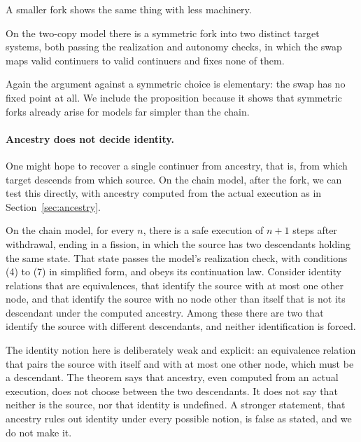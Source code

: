 A smaller fork shows the same thing with less machinery.

\begin{proposition}
\label{prop:symmetric-fork}
On the two-copy model there is a symmetric fork into two distinct target
systems, both passing the realization and autonomy checks, in which the swap
maps valid continuers to valid continuers and fixes none of them.
\end{proposition}

Again the argument against a symmetric choice is elementary: the swap has no
fixed point at all. We include the proposition because it shows that symmetric
forks already arise for models far simpler than the chain.

\paragraph{Ancestry does not decide identity.}
One might hope to recover a single continuer from ancestry, that is, from
which target descends from which source. On the chain model, after the fork,
we can test this directly, with ancestry computed from the actual execution as
in Section~\ref{sec:ancestry}.

\begin{theorem}
\label{thm:identity}
On the chain model, for every $n$, there is a safe execution of $n+1$ steps
after withdrawal, ending in a fission, in which the source has two descendants
holding the same state. That state passes the model's realization
check, with conditions (4) to (7) in simplified form, and obeys its
continuation law.
Consider identity relations that are equivalences, that identify the source
with at most one other node, and that identify the source with no node other
than itself that is not its descendant under the computed ancestry. Among these there are two that
identify the source with different descendants, and neither identification is
forced.
\end{theorem}

The identity notion here is deliberately weak and explicit: an equivalence
relation that pairs the source with itself and with at most one other node,
which must be a descendant. The theorem says that ancestry, even computed from an actual
execution, does not choose between the two descendants. It does not say that
neither is the source, nor that identity is undefined. A stronger statement,
that ancestry rules out identity under every possible notion, is false as
stated, and we do not make it.

